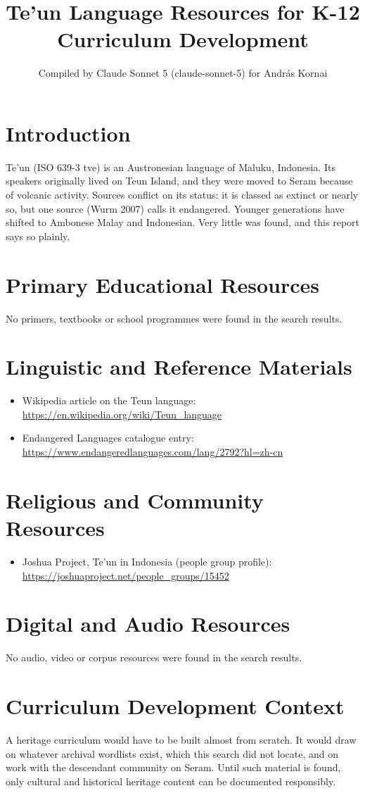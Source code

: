 \documentclass[12pt]{article}
\title{Te'un Language Resources for K-12 Curriculum Development}
\author{Compiled by Claude Sonnet 5 (claude-sonnet-5) for Andr\'as Kornai}
\date{}
\begin{document}
\maketitle

\section{Introduction}
Te'un (ISO 639-3 tve) is an Austronesian language of Maluku, Indonesia. Its speakers originally lived on Teun Island, and they were moved to Seram because of volcanic activity. Sources conflict on its status: it is classed as extinct or nearly so, but one source (Wurm 2007) calls it endangered. Younger generations have shifted to Ambonese Malay and Indonesian. Very little was found, and this report says so plainly.

\section{Primary Educational Resources}
No primers, textbooks or school programmes were found in the search results.

\section{Linguistic and Reference Materials}
\begin{itemize}
\item Wikipedia article on the Teun language: \url{https://en.wikipedia.org/wiki/Teun_language}
\item Endangered Languages catalogue entry: \url{https://www.endangeredlanguages.com/lang/2792?hl=zh-cn}
\end{itemize}

\section{Religious and Community Resources}
\begin{itemize}
\item Joshua Project, Te'un in Indonesia (people group profile): \url{https://joshuaproject.net/people_groups/15452}
\end{itemize}

\section{Digital and Audio Resources}
No audio, video or corpus resources were found in the search results.

\section{Curriculum Development Context}
A heritage curriculum would have to be built almost from scratch. It would draw on whatever archival wordlists exist, which this search did not locate, and on work with the descendant community on Seram. Until such material is found, only cultural and historical heritage content can be documented responsibly.
\end{document}
